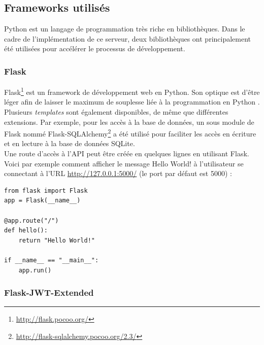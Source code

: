 \subsection{Frameworks utilisés}

Python est un langage de programmation très riche en bibliothèques. Dans le cadre de l'implémentation de ce serveur, deux bibliothèques ont principalement été utilisées pour accélérer le processus de développement.

\subsubsection{Flask}
\label{sec-framework_flask}


Flask\footnote{\url{http://flask.pocoo.org/}} est un framework de développement web en Python. Son optique est d'être léger afin de laisser le maximum de souplesse liée à la programmation en Python \cite{Flaskfra59:online}. Plusieurs \textit{templates} sont également disponibles, de même que différentes extensions. Par exemple, pour les accès à la base de données, un sous module de Flask nommé Flask-SQLAlchemy\footnote{\url{http://flask-sqlalchemy.pocoo.org/2.3/}} a été utilisé pour faciliter les accès en écriture et en lecture à la base de données SQLite. \\


Une route d'accès à l'API peut être créée en quelques lignes en utilisant Flask. Voici par exemple comment afficher le message Hello World! à l'utilisateur se connectant à l'URL \url{http://127.0.0.1:5000/} (le port par défaut est 5000) :
\begin{tcolorbox}[top=-3mm, bottom=-3mm, left=0mm, right=0mm, enhanced, breakable, colback=LightGray, colframe=DarkGray, colbacktitle=DarkGray]
\begin{verbatim}
from flask import Flask
app = Flask(__name__)
 
@app.route("/")
def hello():
    return "Hello World!"
 
if __name__ == "__main__":
    app.run()
\end{verbatim}
\end{tcolorbox}


\subsubsection{Flask-JWT-Extended}


